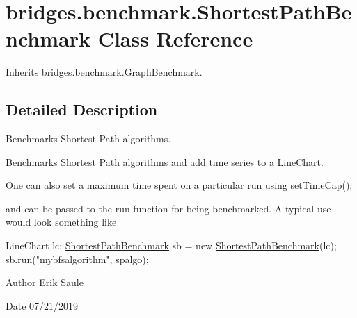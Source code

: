 \hypertarget{classbridges_1_1benchmark_1_1_shortest_path_benchmark}{}\section{bridges.\+benchmark.\+Shortest\+Path\+Benchmark Class Reference}
\label{classbridges_1_1benchmark_1_1_shortest_path_benchmark}


Inherits bridges.\+benchmark.\+Graph\+Benchmark.



\subsection{Detailed Description}
Benchmarks Shortest Path algorithms. 

Benchmarks Shortest Path algorithms and add time series to a Line\+Chart.

One can also set a maximum time spent on a particular run using set\+Time\+Cap();

and can be passed to the run function for being benchmarked. A typical use would look something like


\begin{DoxyCode}
LineChart lc;
\hyperlink{classbridges_1_1benchmark_1_1_shortest_path_benchmark_ad878c2ad9c6912170601092423c54c43}{ShortestPathBenchmark} sb = \textcolor{keyword}{new} \hyperlink{classbridges_1_1benchmark_1_1_shortest_path_benchmark_ad878c2ad9c6912170601092423c54c43}{ShortestPathBenchmark}(lc);
sb.run(\textcolor{stringliteral}{"mybfsalgorithm"}, spalgo);
\end{DoxyCode}


\begin{DoxyAuthor}{Author}
Erik Saule 
\end{DoxyAuthor}
\begin{DoxyDate}{Date}
07/21/2019 
\end{DoxyDate}
